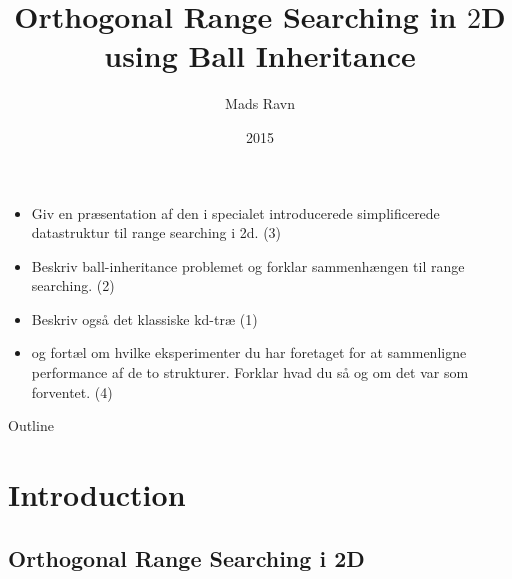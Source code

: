 \documentclass[pdf]{beamer}
\title{Orthogonal Range Searching in $2$D\\ using Ball Inheritance}
\author{Mads Ravn}
\institute{Computer Science, Aarhus University}
\date{2015}
\begin{document}
\begin{frame}
  \titlepage
\end{frame}

\begin{frame}
  \begin{itemize}
    \item Giv en præsentation af den i specialet introducerede simplificerede datastruktur til range searching i 2d. (3)
    \item Beskriv ball-inheritance problemet og forklar sammenhængen til range searching. (2)
    \item Beskriv også det klassiske kd-træ (1)
    \item og fortæl om hvilke eksperimenter du har foretaget for at sammenligne performance af de to strukturer. Forklar hvad du så og om det var som forventet. (4)
  \end{itemize}
\end{frame}

\begin{frame}{Outline}
  \tableofcontents
\end{frame}

\section{Introduction}
\subsection{Orthogonal Range Searching i 2D}
\end{document}
